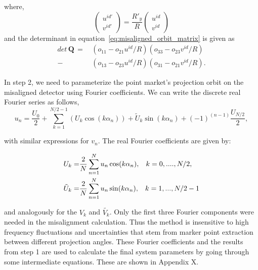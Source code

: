 where, 
\begin{equation}
\begin{pmatrix}
u^{id'} \\
v^{id'}
\end{pmatrix} = \frac{R'_y}{R}
\begin{pmatrix}
u^{id}\\
v^{id}
\end{pmatrix}
\end{equation}
and the determinant in equation~\ref{eq:misaligned_orbit_matrix} is given as
\begin{equation}
\begin{aligned}
det \, \mathrm{\mathbf{Q}} \, = \, &(o_{11} - o_{21} u^{id}/R) (o_{33} - o_{23} v^{id}/R) \\
                           - &(o_{13} - o_{23} u^{id}/R) (o_{31} - o_{21} v^{id}/R ).
\end{aligned}
\label{eq:detQ}
\end{equation}

In step 2, we need to parameterize the point market's projection orbit on the misaligned detector using Fourier coefficients.  We can write the discrete real Fourier series as follows, 
\begin{equation}\label{eq:fourierseries}
u_n = \frac{U_0}{2} + \sum ^{N/2-1}_{k=1} (U_k \cos (k\alpha_n)) + \tilde{U}_k \sin (k \alpha_n) + (-1)^{(n-1)} \frac{U_{N/2}}{2}, 
\end{equation}

\noindent with similar expressions for $v_n$.  The real Fourier coefficients are given by:

\begin{equation}\label{eq:fouriercoeff}
\begin{split}
U_k = & \frac{2}{N}\sum_{n=1}^{N} u_n \cos (k \alpha_n), \hspace{0.3cm} k = 0, ...., N/2, \\
\tilde{U}_k = & \frac{2}{N} \sum_{n=1}^{N} u_n \sin (k \alpha_n), \hspace{0.3cm} k = 1,...,N/2-1
\end{split}
\end{equation}

\noindent and analogously for the $V_k$ and $\tilde{V_k}$.  Only the first three Fourier components were needed in the misalignment calculation. Thus the method is insensitive to high frequency fluctuations and uncertainties that stem from marker point extraction between different projection angles.  These Fourier coefficients and the results from step 1 are used to calculate the final system parameters by going through some intermediate equations.  These are shown in Appendix X.

